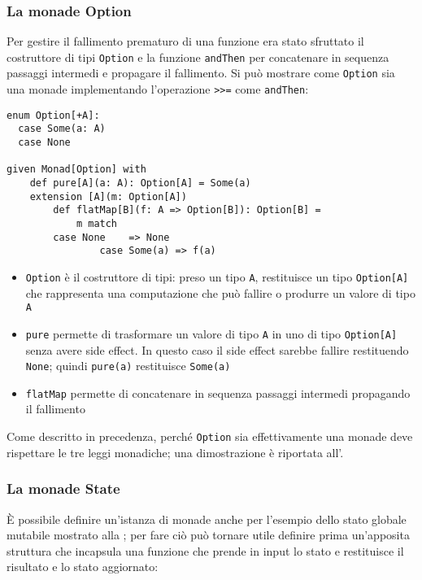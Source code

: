\subsubsection{La monade Option}
\label{la-monade-optional}
Per gestire il fallimento prematuro di una funzione era stato sfruttato il costruttore di tipi \lstinline{Option} e la funzione \lstinline{andThen} per concatenare in sequenza passaggi intermedi e propagare il fallimento.
Si può mostrare come \lstinline{Option} sia una monade implementando l'operazione \lstinline{>>=} come \lstinline{andThen}:
\begin{lstlisting}[language=scala3]
enum Option[+A]:
  case Some(a: A)
  case None

given Monad[Option] with
	def pure[A](a: A): Option[A] = Some(a)
	extension [A](m: Option[A]) 
		def flatMap[B](f: A => Option[B]): Option[B] =
			m match
        case None    => None
				case Some(a) => f(a)
\end{lstlisting}

\begin{itemize}
  \item \lstinline{Option} è il costruttore di tipi: preso un tipo \lstinline{A}, restituisce un tipo \lstinline{Option[A]} che rappresenta una computazione che può fallire o produrre un valore di tipo \lstinline{A}
  \item \lstinline{pure} permette di trasformare un valore di tipo  \lstinline{A} in uno di tipo \lstinline{Option[A]} senza avere side effect. In questo caso il side effect sarebbe fallire restituendo \lstinline{None}; quindi \lstinline{pure(a)} restituisce \lstinline{Some(a)}
  \item \lstinline{flatMap} permette di concatenare in sequenza passaggi intermedi propagando il fallimento
\end{itemize}

Come descritto in precedenza, perché \lstinline{Option} sia effettivamente una monade deve rispettare le tre leggi monadiche; una dimostrazione è riportata all'.

\subsubsection{La monade State}
\label{la-monade-state}

È possibile definire un'istanza di monade anche per l'esempio dello stato globale mutabile mostrato alla ; per fare ciò può tornare utile definire prima un'apposita struttura che incapsula una funzione che prende in input lo stato e restituisce il risultato e lo stato aggiornato:

